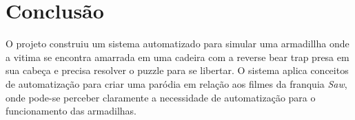 \chapter{Conclusão}

O projeto construiu um sistema automatizado para simular uma armadillha onde a vitima se encontra amarrada em uma cadeira com a reverse bear trap presa em sua cabeça e precisa resolver o puzzle para se libertar. O sistema aplica conceitos de automatização para criar uma paródia em relação aos filmes da franquia \textit{Saw}, onde pode-se perceber claramente a necessidade de automatização para o funcionamento das armadilhas.
